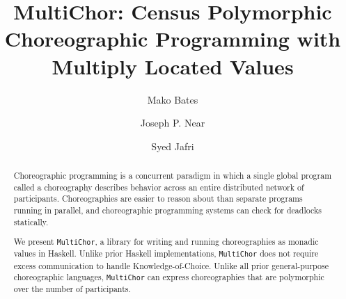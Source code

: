 \documentclass[sigplan,screen]{acmart}
\newcommand{\MultiChor}{\texttt{Multi\-Chor}\xspace}
\begin{document}
\title[MultiChor]{MultiChor: Census Polymorphic Choreographic Programming with Multiply Located Values}


\author{Mako Bates}

\author{Joseph P. Near}
 
\author{Syed Jafri}

\renewcommand{\shortauthors}{Trovato et al.}

\begin{abstract}
  Choreographic programming is a concurrent paradigm
  in which a single global program called a choreography
  describes behavior across an entire distributed network of participants.
  Choreographies are easier to reason about than separate programs running in parallel,
  and choreographic programming systems can check for deadlocks statically.

  We present \MultiChor, a library for writing and running choreographies as
  monadic values in Haskell.
  Unlike prior Haskell implementations,
  \MultiChor does not require excess communication to handle Knowledge-of-Choice.
  Unlike all prior general-purpose choreographic languages,
  \MultiChor can express choreographies that are polymorphic over the number of participants.
\end{abstract}
\end{document}
